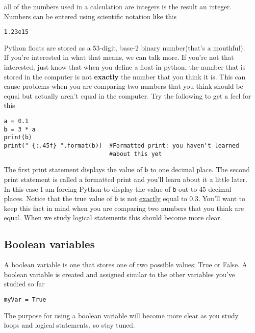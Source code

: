 all of the numbers used in a calculation are integers is the result an
integer.  
Numbers can be entered using scientific notation like this
\begin{Verbatim}
1.23e15
\end{Verbatim}
Python floats are stored as a 53-digit, base-2 binary number(that's a
mouthful).  If you're interested in what that means, we can talk more.
If you're not that interested, just know that when you define a float
in python, the number that is stored in the computer is not
\textbf{exactly} the number that you think it is.  This can cause
problems when you are comparing two numbers that you think should be
equal but actually aren't equal in the computer.   Try the following to get a feel for this
\begin{Verbatim}
a = 0.1
b = 3 * a
print(b)
print(" {:.45f} ".format(b))  #Formatted print: you haven't learned
                              #about this yet
\end{Verbatim}
The first print statement displays the value of \texttt{b} to one
decimal place.  The second print statement is called a formatted print
and you'll learn about it a little later.  In this case I am forcing
Python to display the value of \texttt{b} out to 45 decimal places.
Notice that the true value of \texttt{b} is not \ul{exactly} equal to
0.3.  You'll want to keep this fact in mind when you are comparing two
numbers that you think are equal.  When we study logical statements
this should become more clear.

\subsection*{Boolean variables}
A boolean variable is one that stores one of two possible values: True
or False.  A boolean variable is created and assigned similar to the
other variables you've studied so far
\begin{Verbatim}
myVar = True
\end{Verbatim}
The purpose for using a boolean variable will become more clear as you
study loops and logical statements, so stay tuned.

